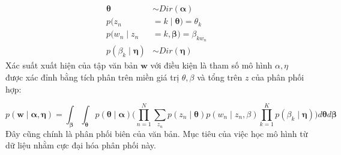 \documentclass[fontsize=13pt]{scrartcl}
\begin{document}
\begin{align}
\boldsymbol\theta &\sim Dir(\boldsymbol\alpha)\\
p(z_n &= k\mid \boldsymbol\theta) = \theta_k\\
p(w_n\mid z_n &= k,\boldsymbol \beta) = \beta_{kw_n}\\
p(\beta_k \mid \boldsymbol\eta) & \sim Dir(\boldsymbol\eta) 
\end{align}
Xác suất xuất hiện của tập văn bản $\mathbf{w}$ với điều kiện là tham số mô hình $\alpha, \eta$ được xác đỉnh bằng tích phân trên miền giá trị $\theta, \beta$ và tổng trên $z$ của phân phối hợp:


\begin{equation}\label{eq:margin_dis}
p(\mathbf{w} \mid \boldsymbol{\alpha},\boldsymbol\eta)= \int_{\boldsymbol\beta}\int_{\boldsymbol\theta} p(\boldsymbol\theta \mid \boldsymbol\alpha)\big(\prod_{n=1}^{N}\sum_{z_n}p(z_n\mid \boldsymbol\theta) p (w_n\mid z_n,\beta) \prod_{k=1}^{K}p(\beta_k\mid \boldsymbol\eta) \big)d\boldsymbol\theta d\boldsymbol\beta
\end{equation}
Đây cũng chính là phân phối biên của văn bản. Mục tiêu của việc học mô hình từ dữ liệu nhằm cực đại hóa phân phối này. 
\end{document}
